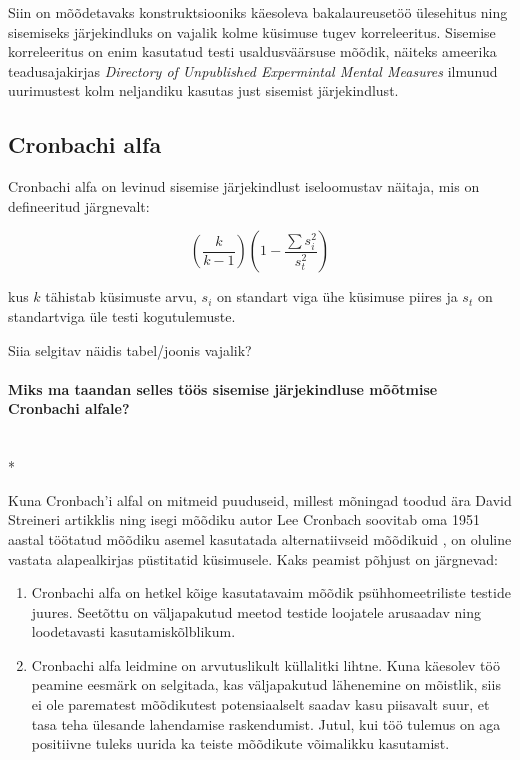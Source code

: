 \documentclass[a4paper]{article}
\begin{document}
Siin on mõõdetavaks konstruktsiooniks käesoleva bakalaureusetöö \"ulesehitus ning sisemiseks järjekindluks on vajalik kolme k\"usimuse tugev korreleeritus. Sisemise korreleeritus on enim kasutatud testi usaldusväärsuse mõõdik, näiteks ameerika teadusajakirjas \textit{Directory of Unpublished Expermintal Mental Measures} ilmunud uurimustest kolm neljandiku kasutas just sisemist järjekindlust.\cite[177] {Henson2001}



\subsection{Cronbachi alfa}

Cronbachi alfa on levinud sisemise järjekindlust iseloomustav näitaja, mis on defineeritud järgnevalt:

\begin{equation}
(\frac{k}{k-1})( 1 - \frac{\sum s_i^2}{s_t^2})
\end{equation}

kus $k$ tähistab k\"usimuste arvu, $s_i$ on standart viga \"uhe k\"usimuse piires ja $s_t$ on standartviga \"ule testi kogutulemuste.\cite[396]{Cronbach2004}

{\color{cyan} Siia selgitav näidis tabel/joonis vajalik?}

\paragraph{Miks ma taandan selles töös sisemise järjekindluse mõõtmise Cronbachi alfale?}\mbox{}\\*

Kuna Cronbach'i alfal on mitmeid puuduseid, millest mõningad toodud ära David Streineri artikklis \cite[101-102]{Streiner2010} ning isegi mõõdiku autor Lee Cronbach soovitab oma 1951 aastal töötatud mõõdiku asemel kasutatada alternatiivseid mõõdikuid \cite{Cronbach2004}, on oluline vastata alapealkirjas p\"ustitatid k\"usimusele. Kaks peamist põhjust on järgnevad:
\begin{enumerate}[I]
\item Cronbachi alfa on hetkel kõige kasutatavaim mõõdik ps\"uhhomeetriliste testide juures. Seetõttu on väljapakutud meetod testide loojatele arusaadav ning loodetavasti kasutamiskõlblikum.
\item Cronbachi alfa leidmine on arvutuslikult k\"ullalitki lihtne. Kuna käesolev töö peamine eesmärk on selgitada, kas väljapakutud lähenemine on mõistlik, siis ei ole parematest mõõdikutest potensiaalselt saadav kasu piisavalt suur, et tasa teha \"ulesande lahendamise raskendumist. Jutul, kui töö tulemus on aga positiivne tuleks  uurida ka teiste mõõdikute võimalikku kasutamist.

\end{enumerate}
\end{document}
